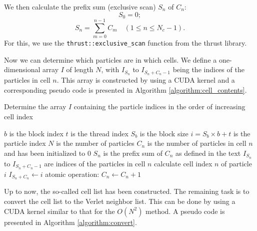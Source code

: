 \documentclass[12pt,a4paper]{report}
\begin{document}
We then calculate the prefix sum (exclusive scan) $S_n$ of $C_n$:
\begin{equation}
S_0 = 0;
\end{equation}
\begin{equation}
S_n = \sum_{m=0}^{n-1} C_m \quad (1 \leq n \leq N_c-1).
\end{equation}
For this, we use the \verb"thrust::exclusive_scan" function from the thrust library.

Now we can determine which particles are in which cells. We define a one-dimensional array $I$ of length $N$, with $I_{S_n}$ to $I_{S_n + C_n - 1}$ being the indices of the particles in cell $n$. This array is constructed by using a CUDA kernel and a corresponding pseudo code is presented in Algorithm \ref{algorithm:cell_contents}.

\begin{algorithm}[htbp]
\caption{Determine the array $I$  containing the particle indices in the order of increasing cell index}
\label{algorithm:cell_contents}
\begin{algorithmic}[1]
\Require $b$ is the block index
\Require $t$ is the thread index
\Require $S_b$ is the block size
\Require $i=S_b\times b+t$ is the particle index
\Require $N$ is the number of particles
\Require $C_n$ is the number of particles in cell $n$ and has been initialized to 0
\Require $S_n$ is the prefix sum of $C_n$ as defined in the text
\Require $I_{S_n}$ to $I_{S_n + C_n - 1}$ are indices of the particles in cell $n$
	\State calculate cell index $n$ of particle $i$
    \State $I_{S_n + C_n} \leftarrow i$
	\State atomic operation: $C_n \leftarrow C_n +1$
\EndIf
 \end{algorithmic}
\end{algorithm}

Up to now, the so-called cell list has been constructed. The remaining task is to convert the cell list to the Verlet neighbor list. This can be done by using a CUDA kernel similar to that for the $O(N^2)$ method. A pseudo code is presented in Algorithm \ref{algorithm:convert}.
\end{document}
